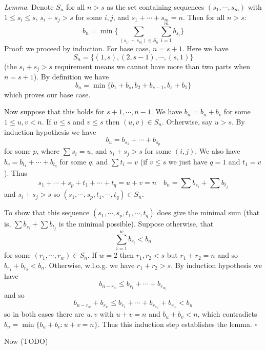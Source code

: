\documentclass[11pt]{article}
\newcommand{\<}{\langle}
\renewcommand{\>}{\rangle}
\begin{document}
\begin{enumerate}
	\emph{Lemma}. Denote $S_n$ for all $n>s$ as the set containing sequences $(s_1, \cdots, s_{m})$ with $1\le s_i\le s$, $s_i+s_j>s$ for some $i, j$, and $s_1+\cdots + s_m = n$. Then for all $n>s$: 
	\[
	b_n = \min\{\sum_{(s_1, \cdots, s_{m})\in S_n}\sum_{i=1}^m b_{s_i}\}
	\]
	Proof: we proceed by induction. For base case, $n=s+1$. Here we have 
	\[
	S_n = \{(1, s), (2, s-1), \cdots, (s, 1)\}
	\]
	(the $s_i+s_j>s$ requirement means we cannot have more than two parts when $n=s+1$). 
	By definition we have 
	\[
	b_n = \min \{b_1+b_s, b_2 + b_{s-1}, b_s+b_1\}
	\]
	which proves our base case. 
	
	Now suppose that this holds for $s+1, \cdots, n-1$. 
	We have $b_n = b_u + b_{v}$ for some $1\le u, v<n$. 
	If $u\le s$ and $v\le s$ then $(u, v)\in S_n$. 
	Otherwise, say $u>s$. 
	By induction hypothesis we have 
	\[
	b_u = b_{s_1}+\cdots + b_{s_p}
	\]
	for some $p$, where $\sum s_i = u$, and $s_i+s_j>s$ for some $(i, j)$. 
	We also have $b_v = b_{t_1}+\cdots + b_{t_q}$ for some $q$, 
	and $\sum t_i=v$ (if $v\le s$ we just have $q=1$ and $t_1=v$). 
	Thus 
	\[
	s_1+\cdots + s_p + t_1+\cdots + t_q = u + v = n
	\quad 
	b_n = \sum b_{s_i} + \sum b_{t_j}
	\]
	and $s_i+s_j>s$ so $(s_1, \cdots, s_p, t_1, \cdots, t_q)\in S_n$. 
	
	To show that this sequence $(s_1, \cdots, s_p, t_1, \cdots, t_q)$ does give the minimal sum 
	(that is, $\sum b_{s_i} + \sum b_{t_j}$ is the minimal possible). 
	Suppose otherwise, that 
	\[
	\sum_{i=1}^w b_{r_i} < b_n
	\]
	for some $(r_1, \cdots, r_w)\in S_n$. 
	If $w=2$ then $r_1, r_2<s$ but $r_1+r_2=n$ and so $b_{r_1}+b_{r_2}<b_n$. 
	Otherwise, w.l.o.g. we have $r_1+r_2>s$. 
	By induction hypothesis we have 
	\[
	b_{n-r_w}\le b_{r_1}+\cdots + b_{r_{w_1}}
	\]
	and so 
	\[
	b_{n-r_w}+b_{r_w}
	\le b_{r_1}+\cdots + b_{r_{w_1}} + b_{r_w}
	< b_n
	\]
	so in both cases there are $u, v$ with $u+v=n$ and $b_u+b_v<n$, which contradicts 
	$b_n = \min \{b_u+b_v: u+v=n\}$. 
	Thus this induction step establishes the lemma. $\square$
	
	Now (TODO)
	
\end{enumerate}
	
\end{document}
